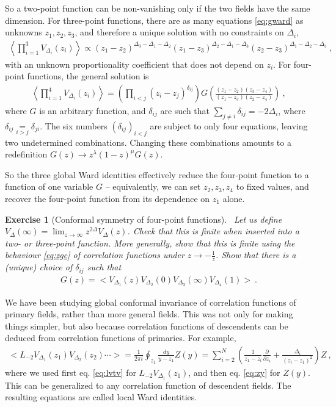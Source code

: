 \documentclass[12pt, a4paper]{article}
\theoremstyle{break}
\newtheorem{exo}{Exercise}[section]
\begin{document}
So a two-point function can be non-vanishing only if the two fields have the same dimension.
For three-point functions, there are as many equations \eqref{eq:gward} as unknowns $z_1,z_2,z_3$, and therefore a unique solution with no constraints on $\Delta_i$,
\begin{align}
 \left< \prod_{i=1}^3 V_{\Delta_i}(z_i) \right> \propto (z_1-z_2)^{\Delta_3-\Delta_1-\Delta_2} (z_1-z_3)^{\Delta_2-\Delta_1-\Delta_3} (z_2-z_3)^{\Delta_1-\Delta_2-\Delta_3}\ ,
 \label{eq:3pt}
\end{align}
with an unknown proportionality coefficient that does not depend on $z_i$.
For four-point functions, the general solution is
\begin{align}
 \left< \prod_{i=1}^4 V_{\Delta_i}(z_i) \right> = \left(\prod_{i<j}(z_i-z_j)^{\delta_{ij}}\right) G\left(\frac{(z_1-z_2)(z_3-z_4)}{(z_1-z_3)(z_2-z_4)}\right)\ ,
\end{align}
where $G$ is an arbitrary function, and $\delta_{ij}$ are such that $\sum_{j\neq i} \delta_{ij} = -2\Delta_i$, where $\delta_{ij}\underset{i>j}{=}\delta_{ji}$. The six numbers $(\delta_{ij})_{i<j}$ are subject to only four equations, leaving two undetermined combinations. Changing these combinations amounts to a redefinition $G(z)\to z^\lambda (1-z)^\mu G(z)$.

So the three global Ward identities effectively reduce the four-point function to a function of one variable $G$ -- equivalently, we can set $z_2,z_3,z_4$ to fixed values, and recover the four-point function from its dependence on $z_1$ alone. 

\begin{exo}[Conformal symmetry of four-point functions]
~\label{exo:4pt}
 Let us define $V_\Delta(\infty) = \lim_{z\to\infty} z^{2\Delta}V_\Delta(z) $. Check that this is finite when inserted into a two- or three-point function. More generally, show that this is finite using the behaviour \eqref{eq:zgc} of correlation functions under $z\to -\frac{1}{z}$. 
 Show that there is a (unique) choice of $\delta_{ij}$ such that 
 \begin{align}
  G(z) = \Big< V_{\Delta_1}(z) V_{\Delta_2}(0)V_{\Delta_3}(\infty)V_{\Delta_4}(1) \Big>\ .
 \end{align}
\end{exo}

We have been studying global conformal invariance of correlation functions of primary fields, rather than more general fields. This was not only for making things simpler, but also because correlation functions of descendents can be deduced from correlation functions of primaries. For example,
\begin{align}
 \Big< L_{-2}V_{\Delta_1}(z_1) V_{\Delta_2}(z_2)\cdots \Big>
  = \frac{1}{2\pi i}\oint_{z_1} \frac{dy}{y-z_1} Z(y)
  =\sum_{i=2}^N\left(\frac{1}{z_1-z_i}\frac{\partial}{\partial z_i} +\frac{\Delta_i}{(z_i-z_1)^2}\right) Z\ ,
  \label{eq:ltv}
\end{align}
where we used first eq. \eqref{eq:lvtv} for $L_{-2}V_{\Delta_1}(z_1)$, and then eq. \eqref{eq:zy} for $Z(y)$.
This can be generalized to any correlation function of descendent fields. The resulting equations are called local Ward identities.
\end{document}
